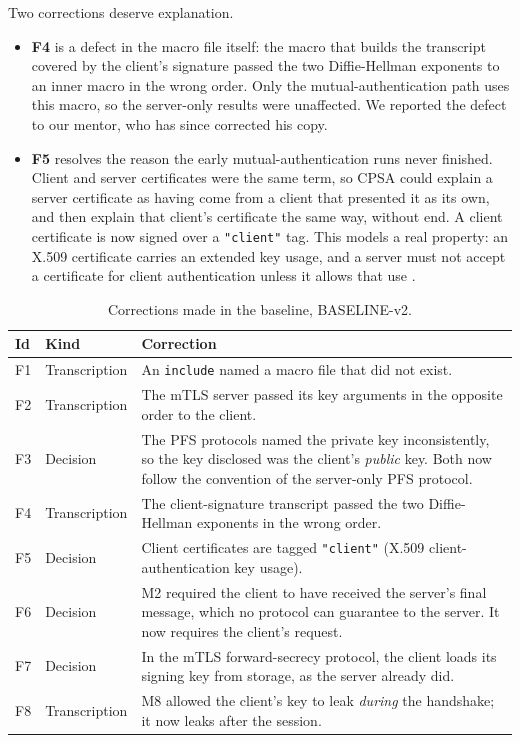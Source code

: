 \documentclass[11pt]{article}
\begin{document}
Two corrections deserve explanation.
\begin{itemize}
    \item \textbf{F4} is a defect in the macro file itself: the macro that builds the transcript covered by the client's signature passed the two Diffie-Hellman exponents to an inner macro in the wrong order. Only the mutual-authentication path uses this macro, so the server-only results were unaffected. We reported the defect to our mentor, who has since corrected his copy.
    \item \textbf{F5} resolves the reason the early mutual-authentication runs never finished. Client and server certificates were the same term, so CPSA could explain a server certificate as having come from a client that presented it as its own, and then explain that client's certificate the same way, without end. A client certificate is now signed over a \texttt{"client"} tag. This models a real property: an X.509 certificate carries an extended key usage, and a server must not accept a certificate for client authentication unless it allows that use \cite{rfc5280}.
\end{itemize}

\begin{table}[h!]
\centering
\small
\begin{tabular}{|l|l|p{11cm}|}
\hline
\textbf{Id} & \textbf{Kind} & \textbf{Correction} \\
\hline
F1 & Transcription & An \texttt{include} named a macro file that did not exist. \\
F2 & Transcription & The mTLS server passed its key arguments in the opposite order to the client. \\
F3 & Decision & The PFS protocols named the private key inconsistently, so the key disclosed was the client's \textit{public} key. Both now follow the convention of the server-only PFS protocol. \\
F4 & Transcription & The client-signature transcript passed the two Diffie-Hellman exponents in the wrong order. \\
F5 & Decision & Client certificates are tagged \texttt{"client"} (X.509 client-authentication key usage). \\
F6 & Decision & M2 required the client to have received the server's final message, which no protocol can guarantee to the server. It now requires the client's request. \\
F7 & Decision & In the mTLS forward-secrecy protocol, the client loads its signing key from storage, as the server already did. \\
F8 & Transcription & M8 allowed the client's key to leak \textit{during} the handshake; it now leaks after the session. \\
\hline
\end{tabular}
\caption{Corrections made in the baseline, BASELINE-v2.}
\label{tab:fixes}
\end{table}
\end{document}
